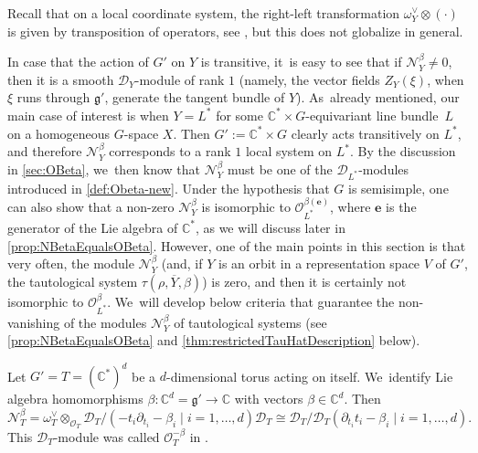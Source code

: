 \documentclass[JEP,XML,SOM,Unicode,published]{cedram}
\let\mathds\mathbb
\newcommand{\bme}{{\boldsymbol{e}}}
\newcommand{\dC}{{\mathds C}}\let\C\dC
\newcommand{\cD}{\mathscr{D}}
\newcommand{\cO}{\mathcal{O}}\let\O\cO
\newcommand{\frg}{\mathfrak{g}}
\begin{document}
Recall that on a local coordinate system, the right-left transformation $\omega_Y^\vee \otimes (\cdot)$ is given by transposition of operators, see \eg \cite[\S 1.2]{Hotta}, but this does not globalize in general.

\begin{rmk}\label{rem:LocSysRkOne}
In case that the action of $G'$ on $Y$ is transitive, it~is easy to see that if $\mathscr N_Y^\beta\neq 0$, then it is a smooth $\cD_Y$\nobreakdash-mod\-ule of rank $1$ (namely, the vector fields $Z_Y(\xi)$, when $\xi$ runs through $\frg'$, generate the tangent bundle of $Y$). As~already mentioned, our main case of interest is when $Y=L^*$ for some $\dC^*\times G$-equivariant line bundle~$L$ on a homogeneous $G$-space $X$. Then $G':=\C^*\times G$ clearly acts transitively on $L^*$, and therefore $\mathscr N_Y^\beta$ corresponds to a rank $1$ local system on $L^*$. By the discussion in \cref{sec:OBeta}, we~then know that $\mathscr N_Y^\beta$ must be one of the $\cD_{L^*}$\nobreakdash-mod\-ules introduced in \cref{def:Obeta-new}. Under the hypothesis that $G$ is semisimple, one can also show that a non-zero $\mathscr{N}_Y^\beta$ is isomorphic to
$\cO_{L^*}^{\beta(\bme)}$, where $\bme$ is the generator of the Lie algebra of $\C^*$, as we will discuss later in \cref{prop:NBetaEqualsOBeta}. However, one of the main points in this section is that very often, the module $\mathscr N_Y^\beta$ (and, if $Y$ is an orbit in a representation space $V$ of $G'$, the tautological system $\tau(\rho,\overline{Y},\beta)$) is zero, and then it is certainly not isomorphic to $\cO_{L^*}^{\beta}$. We~will develop below criteria that guarantee the non-vanishing of the modules $\mathscr N_Y^\beta$ \resp of tautological systems (see \cref{prop:NBetaEqualsOBeta} and \cref{thm:restrictedTauHatDescription} below).
\end{rmk}

\begin{exa}
Let $G' = T = (\C^*)^d$ be a $d$-dimensional torus acting on itself. We~identify Lie algebra homomorphisms $\beta \colon \C^d = \frg' \to \C$ with vectors $\beta \in \C^d$. Then
\[
\mathscr N_T^\beta = \omega_T^\vee \otimes_{\O_T} \mathscr{D}_T/(-t_i \partial_{t_i}-\beta_i \mid i = 1,\dots,d)\mathscr{D}_T \cong \mathscr{D}_T/\mathscr{D}_T(\partial_{t_i} t_i-\beta_i \mid i = 1,\dots,d).
\]
This $\mathscr D_T$\nobreakdash-mod\-ule was called $\O_T^{-\beta}$ in \cite{RS20}. \end{exa}
\end{document}
